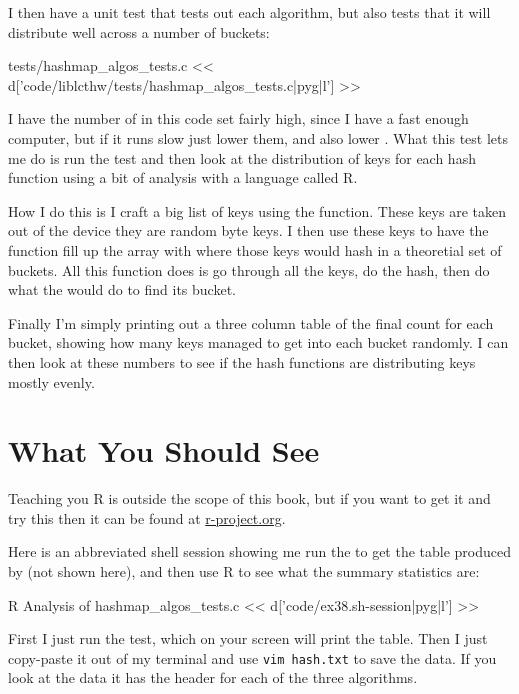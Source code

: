 I then have a unit test that tests out each algorithm, but also tests
that it will distribute well across a number of buckets:

\begin{code}{tests/hashmap\_algos\_tests.c}
<< d['code/liblcthw/tests/hashmap_algos_tests.c|pyg|l'] >>
\end{code}

I have the number of  in this code set fairly high, since I have
a fast enough computer, but if it runs slow just lower them, and also lower
.  What this test lets me do is run the test and then 
look at the distribution of keys for each hash function using a bit 
of analysis with a language called R.

How I do this is I craft a big list of keys using the 
function.  These keys are taken out of the  device
they are random byte keys.  I then use these keys to have the 
function fill up the  array with where those keys would hash
in a theoretial set of buckets.  All this function does is go through all the
keys, do the hash, then do what the  would do to find its
bucket.

Finally I'm simply printing out a three column table of the final count for
each bucket, showing how many keys managed to get into each bucket randomly.
I can then look at these numbers to see if the hash functions are distributing
keys mostly evenly.

\section{What You Should See}

Teaching you R is outside the scope of this book, but if you want to get it
and try this then it can be found at \href{http://www.r-project.org/}{r-project.org}.

Here is an abbreviated shell session showing me run the  to get the table produced by  (not shown here),
and then use R to see what the summary statistics are:

\begin{code}{R Analysis of hashmap\_algos\_tests.c}
<< d['code/ex38.sh-session|pyg|l'] >>
\end{code}

First I just run the test, which on your screen will print the table.  Then I just
copy-paste it out of my terminal and use \verb|vim hash.txt| to save the data.
If you look at the data it has the header  for each of 
the three algorithms.

